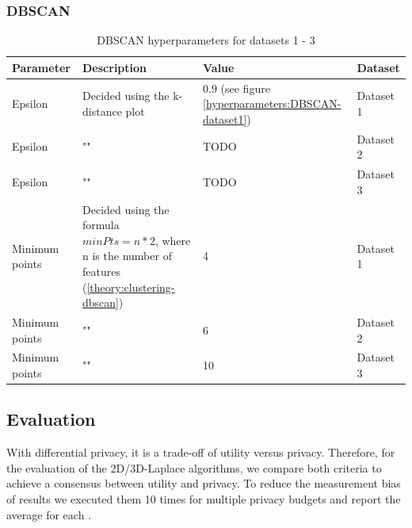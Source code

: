 \subsubsection{DBSCAN}
\begin{table}[h]
  \begin{tabular}{|l|p{6cm}|l|l|}
    \hline
    Parameter      & Description                                                                                                    & Value                                                  & Dataset   \\
    \hline
    Epsilon        & Decided using the k-distance plot                                                                              & 0.9 (see figure \ref{hyperparameters:DBSCAN-dataset1}) & Dataset 1 \\
    \hline
    Epsilon        & ""                                                                                                             & TODO                                                   & Dataset 2 \\
    \hline
    Epsilon        & ""                                                                                                             & TODO                                                   & Dataset 3 \\
    \hline
    Minimum points & Decided using the formula $minPts = n * 2$, where n is the number of features (\ref{theory:clustering-dbscan}) & 4                                                      & Dataset 1 \\
    \hline
    Minimum points & ""                                                                                                             & 6                                                      & Dataset 2 \\
    \hline
    Minimum points & ""                                                                                                             & 10                                                     & Dataset 3 \\
    \hline
  \end{tabular}
  \caption{DBSCAN  hyperparameters for datasets 1 - 3}
  \label{tab:dbscan-formula-sklearn}
\end{table}

\newpage
\subsection{Evaluation}
With differential privacy, it is a trade-off of utility versus privacy.
Therefore, for the evaluation of the 2D/3D-Laplace algorithms, we compare both criteria to achieve a consensus between utility and privacy.
To reduce the measurement bias of results we executed them 10 times for multiple privacy budgets and report the average for each \citep{9679364}.

